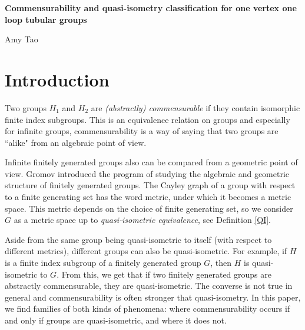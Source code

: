 \documentclass[10pt]{article}
\def\integers{{\mathbb{Z}}}
\theoremstyle{definition}
\begin{document}
\begin{center} \Large \textbf{Commensurability and quasi-isometry classification for one vertex one loop tubular groups}
\normalsize

 \medskip Amy Tao
\end{center}


\begin{abstract}
A tubular group has a graph of groups decomposition with $\integers^2$ vertex groups and $\integers$ edge groups. This paper gives a classification of one vertex one loop tubular groups $G_{(k,\ell),(m,n)} = \langle a,b,t: [a,b]=1, t a^m b^n t^{-1} = a^k b^\ell \rangle$ up to commensurability and quasi-isometry. We show that tubular groups where the images of the edge maps have nonzero ``intersection number" are all commensurable and so quasi-isometric. When the intersection number is zero, there are two quasi-isometry classes and infinitely many commensurability classes. The nonzero and zero intersection number tubular groups are not quasi-isometric. 
\end{abstract}

\section{Introduction}

Two groups $H_1$ and $H_2$ are \textit{(abstractly) commensurable} if they contain isomorphic finite index subgroups. This is an equivalence relation on groups and especially for infinite groups, commensurability is a way of saying that two groups are ``alike" from an algebraic point of view. 

Infinite finitely generated groups also can be compared from a geometric point of view. Gromov introduced the program of studying the algebraic and geometric structure of finitely generated groups. The Cayley graph of a group with respect to a finite generating set has the word metric, under which it becomes a metric space. This metric depends on the choice of finite generating set, so we consider $G$ as a metric space up to \textit{quasi-isometric equivalence}, see Definition \ref{QI}. 

Aside from the same group being quasi-isometric to itself (with respect to different metrics), different groups can also be quasi-isometric. For example, if $H$ is a finite index subgroup of a finitely generated group $G$, then $H$ is quasi-isometric to $G$. From this, we get that if two finitely generated groups are abstractly commensurable, they are quasi-isometric. The converse is not true in general and commensurability is often stronger that quasi-isometry. In this paper, we find families of both kinds of phenomena: where commensurability occurs if and only if groups are quasi-isometric, and where it does not. 
\end{document}
